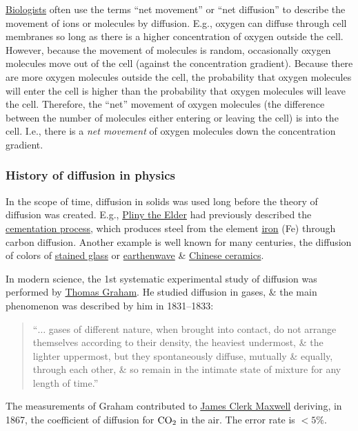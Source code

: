 \documentclass{article}
\begin{document}
\href{https://en.wikipedia.org/wiki/Biologist}{Biologists} often use the terms ``net movement'' or ``net diffusion'' to describe the movement of ions or molecules by diffusion. E.g., oxygen can diffuse through cell membranes so long as there is a higher concentration of oxygen outside the cell. However, because the movement of molecules is random, occasionally oxygen molecules move out of the cell (against the concentration gradient). Because there are more oxygen molecules outside the cell, the probability that oxygen molecules will enter the cell is higher than the probability that oxygen molecules will leave the cell. Therefore, the ``net'' movement of oxygen molecules (the difference between the number of molecules either entering or leaving the cell) is into the cell. I.e., there is a {\it net movement} of oxygen molecules down the concentration gradient.

\subsubsection{History of diffusion in physics}
In the scope of time, diffusion in solids was used long before the theory of diffusion was created. E.g., \href{https://en.wikipedia.org/wiki/Pliny_the_Elder}{\sc Pliny the Elder} had previously described the \href{https://en.wikipedia.org/wiki/Cementation_process}{cementation process}, which produces steel from the element \href{https://en.wikipedia.org/wiki/Iron}{iron} (Fe) through carbon diffusion. Another example is well known for many centuries, the diffusion of colors of \href{https://en.wikipedia.org/wiki/Stained_glass}{stained glass} or \href{https://en.wikipedia.org/wiki/Earthenware}{earthenwave} \& \href{https://en.wikipedia.org/wiki/Chinese_ceramics}{Chinese ceramics}.

In modern science, the 1st systematic experimental study of diffusion was performed by \href{https://en.wikipedia.org/wiki/Thomas_Graham_(chemist)}{\sc Thomas Graham}. He studied diffusion in gases, \& the main phenomenon was described by him in 1831--1833:
\begin{quote}
	``$\ldots$ gases of different nature, when brought into contact, do not arrange themselves according to their density, the heaviest undermost, \& the lighter uppermost, but they spontaneously diffuse, mutually \& equally, through each other, \& so remain in the intimate state of mixture for any length of time.''
\end{quote}
The measurements of Graham contributed to \href{https://en.wikipedia.org/wiki/James_Clerk_Maxwell}{\sc James Clerk Maxwell} deriving, in 1867, the coefficient of diffusion for $\rm CO_2$ in the air. The error rate is $< 5\%$.
\end{document}

